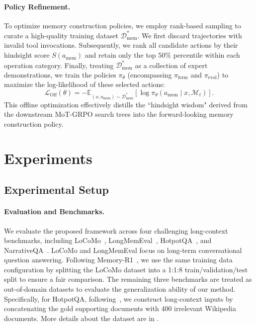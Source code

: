 \documentclass[11pt, a4paper]{lumia}
\begin{document}
\paragraph{Policy Refinement.}
To optimize memory construction policies, we employ rank-based sampling to curate a high-quality training dataset $\mathcal{D}_{\text{mem}}^*$. We first discard trajectories with invalid tool invocations. Subsequently, we rank all candidate actions by their hindsight score $S(a_{\text{mem}})$ and retain only the top $50\%$ percentile within each operation category. 
Finally, treating $\mathcal{D}_{\text{mem}}^*$ as a collection of expert demonstrations, we train the policies $\pi_{\theta}$ (encompassing $\pi_{\text{form}}$ and $\pi_{\text{evol}}$) to maximize the log-likelihood of these selected actions:
\begin{equation}
\mathcal{L}_{\text{Off}}(\theta) = - \mathbb{E}_{(x, a_{\text{mem}}) \sim \mathcal{D}_{\text{mem}}^*} \left[ \log \pi_{\theta}(a_{\text{mem}} \mid x, \mathcal{M}_t) \right].
\end{equation}
This offline optimization effectively distills the ``hindsight wisdom" derived from the downstream MoT-GRPO search trees into the forward-looking memory construction policy.

\vspace{-0.3em}
\section{Experiments}
\vspace{-0.3em}

\subsection{Experimental Setup}
\vspace{-0.3em}
\paragraph{Evaluation and Benchmarks.} We evaluate the proposed framework across four challenging long-context benchmarks, including LoCoMo~\citep{maharana2024evaluating}, LongMemEval~\citep{DBLP:conf/iclr/WuWYZCY25}, HotpotQA~\citep{yang2018hotpotqadatasetdiverseexplainable}, and NarrativeQA~\citep{kočiský2017narrativeqareadingcomprehensionchallenge}. LoCoMo and LongMemEval focus on long-term conversational question answering.
Following Memory-R1~\citep{yan2025memory}, we use the same training data configuration by splitting the LoCoMo dataset into a 1:1:8 train/validation/test split to ensure a fair comparison. The remaining three benchmarks are treated as out-of-domain datasets to evaluate the generalization ability of our method.
Specifically, for HotpotQA, following~\citep{yu2025memagent,yanGeneralAgenticMemory2025}, we construct long-context inputs by concatenating the gold supporting documents with 400 irrelevant Wikipedia documents. More details about the dataset are in .
\vspace{-1em}
\end{document}
